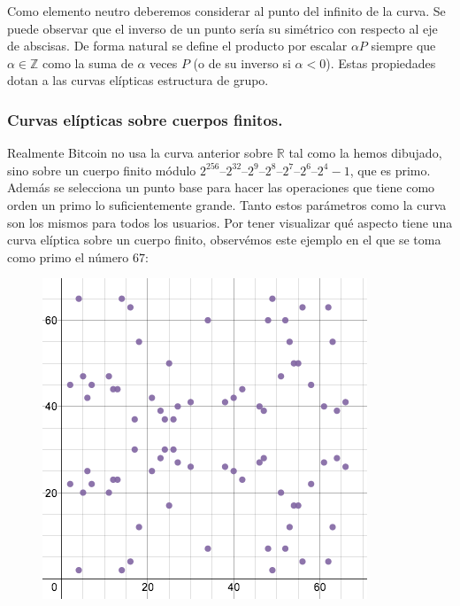 \documentclass[twoside]{article}
\theoremstyle{definition}
\newcommand{\R}{\mathbb{R}}
\newcommand{\Z}{\mathbb{Z}}
\begin{document}
Como elemento neutro deberemos considerar al punto del infinito de la curva. Se puede observar que el inverso de un punto sería su simétrico con respecto al eje de abscisas. De forma natural se define el producto por escalar $\alpha P$ siempre que $\alpha\in\Z$ como la suma de $\alpha$ veces $P$ (o de su inverso si $\alpha<0$). Estas propiedades dotan a las curvas elípticas estructura de grupo.

\subsubsection{Curvas elípticas sobre cuerpos finitos.} 
Realmente Bitcoin no usa la curva anterior sobre $\R$ tal como la hemos dibujado, sino sobre un cuerpo finito módulo $2^{256} – 2^{32} – 2^9 – 2^8 – 2^7 – 2^6 – 2^4 - 1$, que es primo. Además se selecciona un punto base para hacer las operaciones que tiene como orden un primo lo suficientemente grande. Tanto estos parámetros como la curva son los mismos para todos los usuarios. Por tener visualizar qué aspecto tiene una curva elíptica sobre un cuerpo finito, observémos este ejemplo en el que se toma como primo el número $67$:
\begin{figure}[h!]
\includegraphics[scale=0.38]{field}
\end{figure}

\newpage
\end{document}
